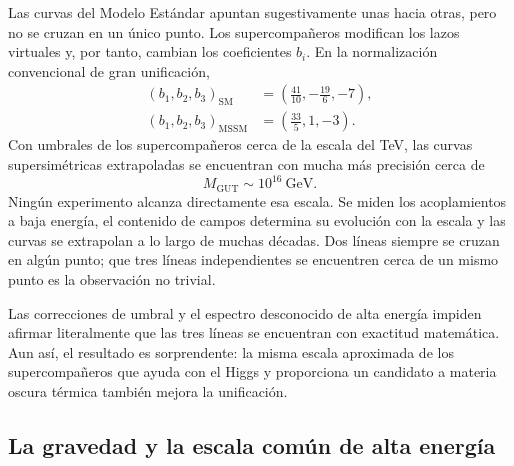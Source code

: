 Las curvas del Modelo Estándar apuntan sugestivamente unas hacia otras, pero no se cruzan en un único punto. Los supercompañeros modifican los lazos virtuales y, por tanto, cambian los coeficientes \(b_i\). En la normalización convencional de gran unificación,
\begin{align}
(b_1,b_2,b_3)_{\mathrm{SM}}
&=\left(\frac{41}{10},-\frac{19}{6},-7\right),\\
(b_1,b_2,b_3)_{\mathrm{MSSM}}
&=\left(\frac{33}{5},1,-3\right).
\end{align}
Con umbrales de los supercompañeros cerca de la escala del TeV, las curvas supersimétricas extrapoladas se encuentran con mucha más precisión cerca de
\begin{equation}
M_{\mathrm{GUT}}\sim 10^{16}\ \mathrm{GeV}.
\end{equation}
Ningún experimento alcanza directamente esa escala. Se miden los acoplamientos a baja energía, el contenido de campos determina su evolución con la escala y las curvas se extrapolan a lo largo de muchas décadas. Dos líneas siempre se cruzan en algún punto; que tres líneas independientes se encuentren cerca de un mismo punto es la observación no trivial.

\begin{classroomqa}
\end{classroomqa}

Las correcciones de umbral y el espectro desconocido de alta energía impiden afirmar literalmente que las tres líneas se encuentran con exactitud matemática. Aun así, el resultado es sorprendente: la misma escala aproximada de los supercompañeros que ayuda con el Higgs y proporciona un candidato a materia oscura térmica también mejora la unificación.

\subsection{La gravedad y la escala común de alta energía}

